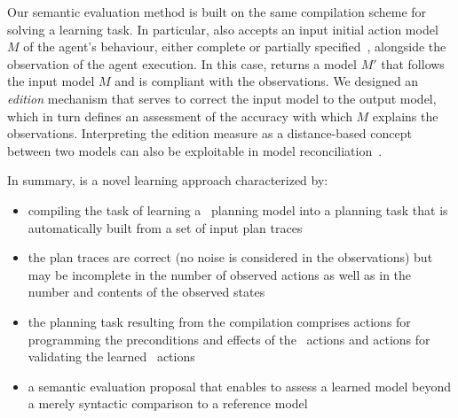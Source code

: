 Our semantic evaluation method is built on the same compilation scheme for solving a learning task. In particular, \FAMA also accepts an input initial action model $M$ of the agent's behaviour, either complete or partially specified~\cite{ZhuoNK13,ZhuoK17}, alongside the observation of the agent execution. In this case, \FAMA returns a model $M'$ that follows the input model $M$ and is compliant with the observations. We designed an {\em edition} mechanism that serves to correct the input model to the output model, which in turn defines an assessment of the accuracy with which $M$ explains the observations. Interpreting the edition measure as a distance-based concept between two models can also be exploitable in model reconciliation~\cite{KulkarniCZVZK16}.




\textcolor[rgb]{1.00,0.00,0.00}{In summary, \FAMA is a novel learning approach characterized by:
\begin{itemize}
\item compiling the task of learning a \strips\ planning model into a planning task that is automatically built from a set of input plan traces
\item the plan traces are correct (no noise is considered in the observations) but may be incomplete in the number of observed actions as well as in the number and contents of the observed states
\item the planning task resulting from the compilation comprises actions for programming the preconditions and effects of the \strips\ actions and actions for validating the learned \strips\ actions
\item a semantic evaluation proposal that enables to assess a learned model beyond a merely syntactic comparison to a reference model
\end{itemize} }

